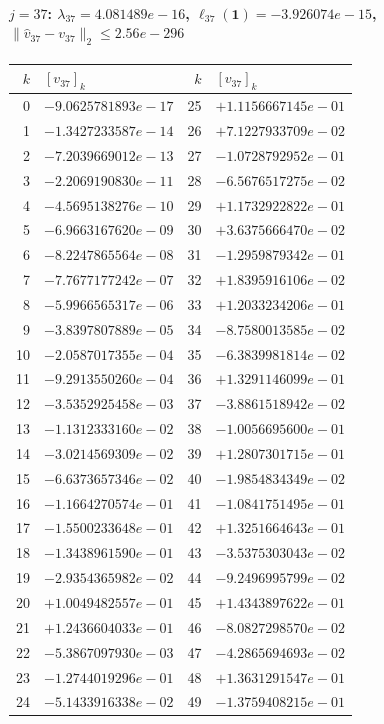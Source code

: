 \paragraph{$j = 37$: $\lambda_{37} = 4.081489e-16$, \quad $\ell_{37}(\mathbf{1}) = -3.926074e-15$, \quad $\|\hat{v}_{37} - v_{37}\|_2 \leq 2.56e-296$}
\begin{center}
{\footnotesize
\begin{tabular}{r@{\;\;}l@{\quad}r@{\;\;}l}
\toprule
$k$ & $[v_{37}]_k$ & $k$ & $[v_{37}]_k$ \\
\midrule
0 & $-9.0625781893e-17$ & 25 & $+1.1156667145e-01$ \\
1 & $-1.3427233587e-14$ & 26 & $+7.1227933709e-02$ \\
2 & $-7.2039669012e-13$ & 27 & $-1.0728792952e-01$ \\
3 & $-2.2069190830e-11$ & 28 & $-6.5676517275e-02$ \\
4 & $-4.5695138276e-10$ & 29 & $+1.1732922822e-01$ \\
5 & $-6.9663167620e-09$ & 30 & $+3.6375666470e-02$ \\
6 & $-8.2247865564e-08$ & 31 & $-1.2959879342e-01$ \\
7 & $-7.7677177242e-07$ & 32 & $+1.8395916106e-02$ \\
8 & $-5.9966565317e-06$ & 33 & $+1.2033234206e-01$ \\
9 & $-3.8397807889e-05$ & 34 & $-8.7580013585e-02$ \\
10 & $-2.0587017355e-04$ & 35 & $-6.3839981814e-02$ \\
11 & $-9.2913550260e-04$ & 36 & $+1.3291146099e-01$ \\
12 & $-3.5352925458e-03$ & 37 & $-3.8861518942e-02$ \\
13 & $-1.1312333160e-02$ & 38 & $-1.0056695600e-01$ \\
14 & $-3.0214569309e-02$ & 39 & $+1.2807301715e-01$ \\
15 & $-6.6373657346e-02$ & 40 & $-1.9854834349e-02$ \\
16 & $-1.1664270574e-01$ & 41 & $-1.0841751495e-01$ \\
17 & $-1.5500233648e-01$ & 42 & $+1.3251664643e-01$ \\
18 & $-1.3438961590e-01$ & 43 & $-3.5375303043e-02$ \\
19 & $-2.9354365982e-02$ & 44 & $-9.2496995799e-02$ \\
20 & $+1.0049482557e-01$ & 45 & $+1.4343897622e-01$ \\
21 & $+1.2436604033e-01$ & 46 & $-8.0827298570e-02$ \\
22 & $-5.3867097930e-03$ & 47 & $-4.2865694693e-02$ \\
23 & $-1.2744019296e-01$ & 48 & $+1.3631291547e-01$ \\
24 & $-5.1433916338e-02$ & 49 & $-1.3759408215e-01$ \\
\bottomrule
\end{tabular}
}
\end{center}

